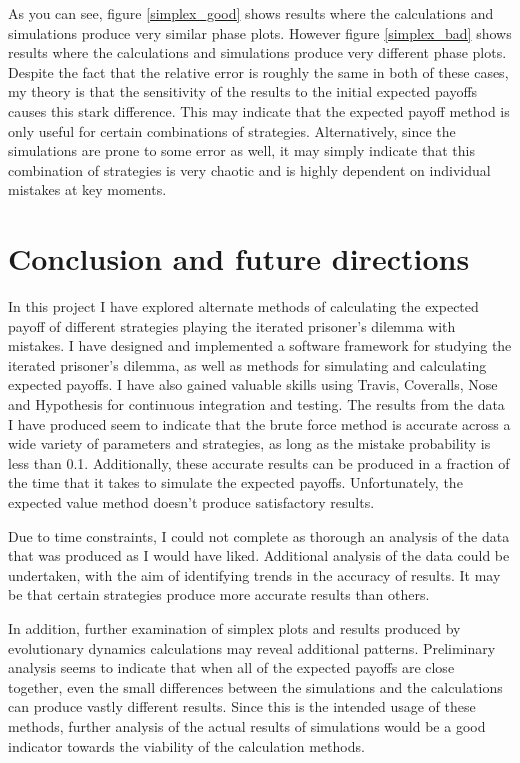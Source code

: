 \documentclass[a4paper,12pt]{article}
\begin{document}
\begin{figure}
\end{figure}

As you can see, figure \ref{simplex_good} shows results where the calculations and simulations produce very similar phase plots.
However figure \ref{simplex_bad} shows results where the calculations and simulations produce very different phase plots.
Despite the fact that the relative error is roughly the same in both of these cases, my theory is that the sensitivity of the results to the initial expected payoffs causes this stark difference.
This may indicate that the expected payoff method is only useful for certain combinations of strategies.
Alternatively, since the simulations are prone to some error as well, it may simply indicate that this combination of strategies is very chaotic and is highly dependent on individual mistakes at key moments.

\clearpage

\section{Conclusion and future directions}

In this project I have explored alternate methods of calculating the expected payoff of different strategies playing the iterated prisoner's dilemma with mistakes.
I have designed and implemented a software framework for studying the iterated prisoner's dilemma, as well as methods for simulating and calculating expected payoffs.
I have also gained valuable skills using Travis, Coveralls, Nose and Hypothesis for continuous integration and testing.
The results from the data I have produced seem to indicate that the brute force method is accurate across a wide variety of parameters and strategies, as long as the mistake probability is less than 0.1.
Additionally, these accurate results can be produced in a fraction of the time that it takes to simulate the expected payoffs.
Unfortunately, the expected value method doesn't produce satisfactory results.

Due to time constraints, I could not complete as thorough an analysis of the data that was produced as I would have liked.
Additional analysis of the data could be undertaken, with the aim of identifying trends in the accuracy of results.
It may be that certain strategies produce more accurate results than others.

In addition, further examination of simplex plots and results produced by evolutionary dynamics calculations may reveal additional patterns.
Preliminary analysis seems to indicate that when all of the expected payoffs are close together, even the small differences between the simulations and the calculations can produce vastly different results.
Since this is the intended usage of these methods, further analysis of the actual results of simulations would be a good indicator towards the viability of the calculation methods.
\end{document}

